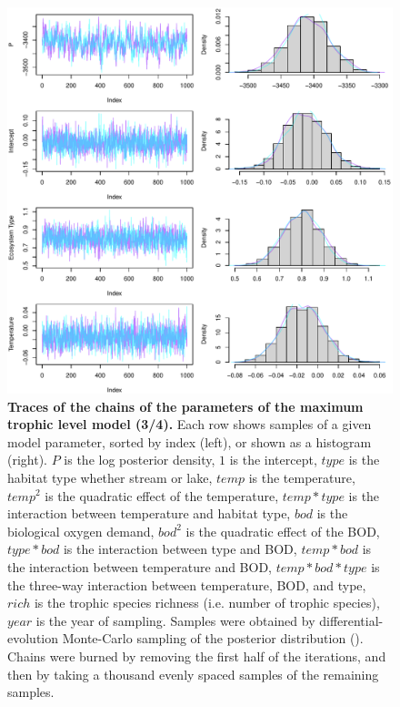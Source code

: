 \documentclass[11pt, oneside]{article}
\begin{document}
\begin{figure}[H]
\begin{center}
\includegraphics[page=3, width=1\linewidth]{scripts/b0_6_4/out_mTL/fig_tracePlot_beta.pdf}
\caption{
    \textbf{Traces of the chains of the parameters of the maximum trophic level model (3/4).}
    Each row shows samples of a given model parameter, sorted by index (left), or shown as a histogram (right).
    $P$ is the log posterior density, $1$ is the intercept, $type$ is the habitat type whether stream or lake, $temp$ is the temperature, $temp^2$ is the quadratic effect of the temperature, $temp * type$ is the interaction between temperature and habitat type, $bod$ is the biological oxygen demand, $bod^2$ is the quadratic effect of the BOD, $type * bod$ is the interaction between type and BOD, $temp * bod$ is the interaction between temperature and BOD, $temp * bod * type$ is the three-way interaction between temperature, BOD, and type, $rich$ is the trophic species richness (i.e. number of trophic species), $year$ is the year of sampling.
    Samples were obtained by differential-evolution Monte-Carlo sampling of the posterior distribution (\cite{TerBraak2006}).
    Chains were burned by removing the first half of the iterations, and then by taking a thousand evenly spaced samples of the remaining samples.
}
\end{center}
\end{figure}
\end{document}
